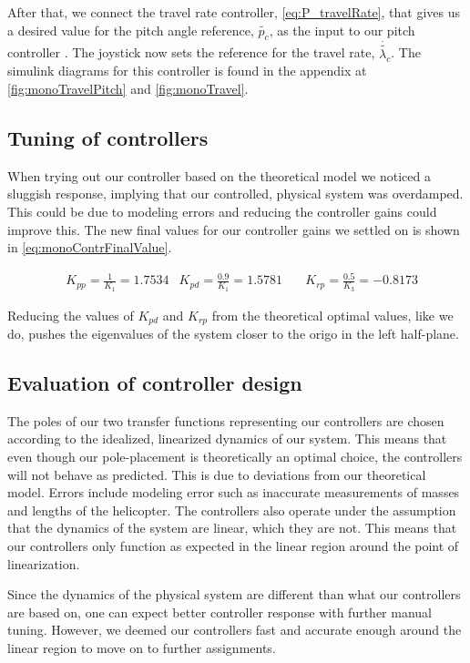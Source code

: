 After that, we  connect the travel rate controller, \cref{eq:P_travelRate}, that gives us a desired value for the pitch angle reference, $\tilde{p_c}$, as the input to our pitch controller . The joystick now sets the reference for the travel rate, $\dot{\tilde{\lambda_c}}$. The simulink diagrams for this controller is found in the appendix at \cref{fig:monoTravelPitch} and \cref{fig:monoTravel}.

\subsection{Tuning of controllers}
When trying out our controller based on the theoretical model we noticed a sluggish response, implying that our controlled, physical system was overdamped. This could be due to modeling errors and reducing the controller gains could improve this.  The new final values for our controller gains we settled on is shown in \cref{eq:monoContrFinalValue}.

\begin{align}\label{eq:monoContrFinalValue}
    &K_{pp} = \frac{1}{K_1}   = 1.7534
    &K_{pd} = \frac{0.9}{K_1} = 1.5781 \quad
    &K_{rp} = \frac{0.5}{K_3} = -0.8173
\end{align}

Reducing the values of $K_{pd}$ and $K_{rp}$ from the theoretical optimal values, like we do, pushes the eigenvalues of the system closer to the origo in the left half-plane.

\subsection{Evaluation of controller design}
The poles of our two transfer functions representing our controllers are chosen according to the idealized, linearized dynamics of our system. This means that even though our pole-placement is theoretically an optimal choice, the controllers will not behave as predicted. This is due to deviations from our theoretical model. Errors include modeling error such as inaccurate measurements of masses and lengths of the helicopter.
The controllers also operate under the assumption that the dynamics of the system are linear, which they are not. This means that our controllers only function as expected in the linear region around the point of linearization.

Since the dynamics of the physical system are different than what our controllers are based on, one can expect better controller response with further manual tuning. However, we deemed our controllers fast and accurate enough around the linear region to move on to further assignments.

